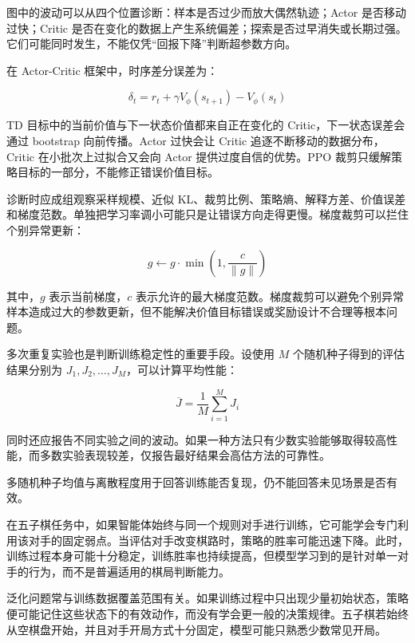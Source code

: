 图中的波动可以从四个位置诊断：样本是否过少而放大偶然轨迹；Actor 是否移动过快；Critic 是否在变化的数据上产生系统偏差；探索是否过早消失或长期过强。它们可能同时发生，不能仅凭“回报下降”判断超参数方向。

在 Actor-Critic 框架中，时序差分误差为：

\begin{equation}
\delta_t
=
r_t
+
\gamma V_{\phi}(s_{t+1})
-
V_{\phi}(s_t)
\end{equation}

TD 目标中的当前价值与下一状态价值都来自正在变化的 Critic，下一状态误差会通过 bootstrap 向前传播。Actor 过快会让 Critic 追逐不断移动的数据分布，Critic 在小批次上过拟合又会向 Actor 提供过度自信的优势。PPO 裁剪只缓解策略目标的一部分，不能修正错误价值目标。

诊断时应成组观察采样规模、近似 KL、裁剪比例、策略熵、解释方差、价值误差和梯度范数。单独把学习率调小可能只是让错误方向走得更慢。梯度裁剪可以拦住个别异常更新：

\begin{equation}
g
\leftarrow
g
\cdot
\min
\left(
1,
\frac{c}{\|g\|}
\right)
\end{equation}

其中，$g$ 表示当前梯度，$c$ 表示允许的最大梯度范数。梯度裁剪可以避免个别异常样本造成过大的参数更新，但不能解决价值目标错误或奖励设计不合理等根本问题。

多次重复实验也是判断训练稳定性的重要手段。设使用 $M$ 个随机种子得到的评估结果分别为 $J_1,J_2,\ldots,J_M$，可以计算平均性能：

\begin{equation}
\overline{J}
=
\frac{1}{M}
\sum_{i=1}^{M}
J_i
\end{equation}

同时还应报告不同实验之间的波动。如果一种方法只有少数实验能够取得较高性能，而多数实验表现较差，仅报告最好结果会高估方法的可靠性。

多随机种子均值与离散程度用于回答训练能否复现，仍不能回答未见场景是否有效。

在五子棋任务中，如果智能体始终与同一个规则对手进行训练，它可能学会专门利用该对手的固定弱点。当评估对手改变棋路时，策略的胜率可能迅速下降。此时，训练过程本身可能十分稳定，训练胜率也持续提高，但模型学习到的是针对单一对手的行为，而不是普遍适用的棋局判断能力。


泛化问题常与训练数据覆盖范围有关。如果训练过程中只出现少量初始状态，策略便可能记住这些状态下的有效动作，而没有学会更一般的决策规律。五子棋若始终从空棋盘开始，并且对手开局方式十分固定，模型可能只熟悉少数常见开局。


